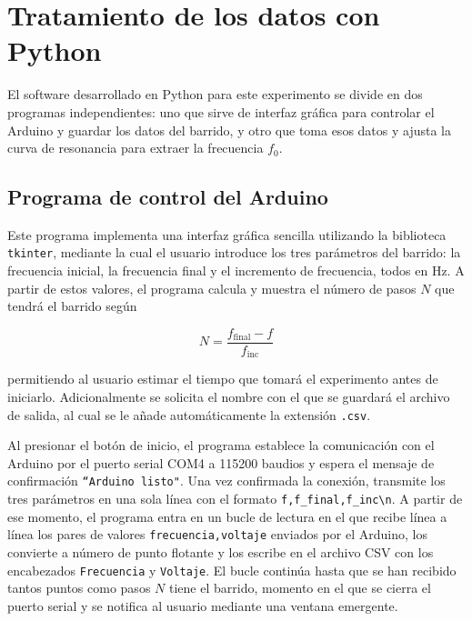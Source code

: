 
\chapter{Tratamiento de los datos con Python}\label{apx:PC}

El software desarrollado en Python para este experimento se divide en dos programas independientes: uno que sirve de interfaz gráfica para controlar el Arduino y guardar los datos del barrido, y otro que toma esos datos y ajusta la curva de resonancia para extraer la frecuencia $f_0$.

\section{Programa de control del Arduino}

Este programa implementa una interfaz gráfica sencilla utilizando la biblioteca \texttt{tkinter}, mediante la cual el usuario introduce los tres parámetros del barrido: la frecuencia inicial, la frecuencia final y el incremento de frecuencia, todos en Hz. A partir de estos valores, el programa calcula y muestra el número de pasos $N$ que tendrá el barrido según

\begin{equation}
    N = \frac{f_{\text{final}} - f}{f_{\text{inc}}}
\end{equation}

permitiendo al usuario estimar el tiempo que tomará el experimento antes de iniciarlo. Adicionalmente se solicita el nombre con el que se guardará el archivo de salida, al cual se le añade automáticamente la extensión \texttt{.csv}.

Al presionar el botón de inicio, el programa establece la comunicación con el Arduino por el puerto serial COM4 a 115200 baudios y espera el mensaje de confirmación \texttt{``Arduino listo"}. Una vez confirmada la conexión, transmite los tres parámetros en una sola línea con el formato \texttt{f,f\_final,f\_inc\textbackslash n}. A partir de ese momento, el programa entra en un bucle de lectura en el que recibe línea a línea los pares de valores \texttt{frecuencia,voltaje} enviados por el Arduino, los convierte a número de punto flotante y los escribe en el archivo CSV con los encabezados \texttt{Frecuencia} y \texttt{Voltaje}. El bucle continúa hasta que se han recibido tantos puntos como pasos $N$ tiene el barrido, momento en el que se cierra el puerto serial y se notifica al usuario mediante una ventana emergente.

